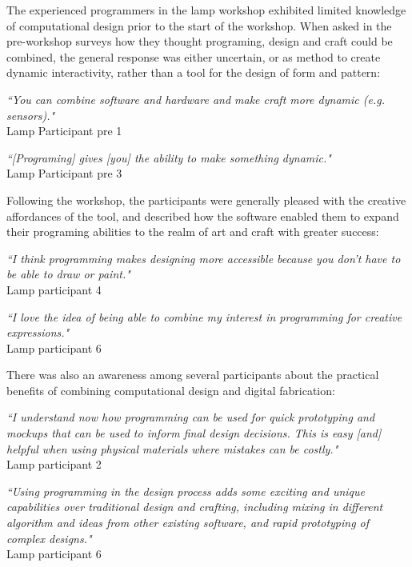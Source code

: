 The experienced programmers in the lamp workshop exhibited limited knowledge of computational design prior to the start of the workshop. When asked in the pre-workshop surveys how they thought programing, design and craft could be combined, the general response was either uncertain, or as method to create dynamic interactivity, rather than a tool for the design of form and pattern:
\begin{flushright}
\textit{``You can combine software and hardware and make craft more dynamic (e.g. sensors)."}
 \\Lamp Participant pre 1
\end{flushright}
\begin{flushright}
\textit{``[Programing] gives [you] the ability to make something dynamic."}
 \\Lamp Participant pre 3
\end{flushright}
Following the workshop, the participants were generally pleased with the creative affordances of the tool, and described how the software enabled them to expand their programing abilities to the realm of art and craft with greater success: 
\begin{flushright}
\textit{``I think programming makes designing more accessible because you don't have to be able to draw or paint."}
\\Lamp participant 4
\end{flushright}

\begin{flushright}
\textit{``I love the idea of being able to combine my interest in programming for creative expressions."}
\\Lamp participant 6
\end{flushright}

There was also an awareness among several participants about the practical benefits of combining computational design and digital fabrication:

\begin{flushright}
\textit{``I understand now how programming can be used for quick prototyping and mockups that can be used to inform final design decisions. This is easy [and] helpful when using physical materials where mistakes can be costly."}
\\Lamp participant 2
\end{flushright}

\begin{flushright}
\textit{``Using programming in the design process adds some exciting and unique capabilities over traditional design and crafting, including mixing in different algorithm and ideas from other existing software, and rapid prototyping of complex designs."}
\\Lamp participant 6
\end{flushright}

